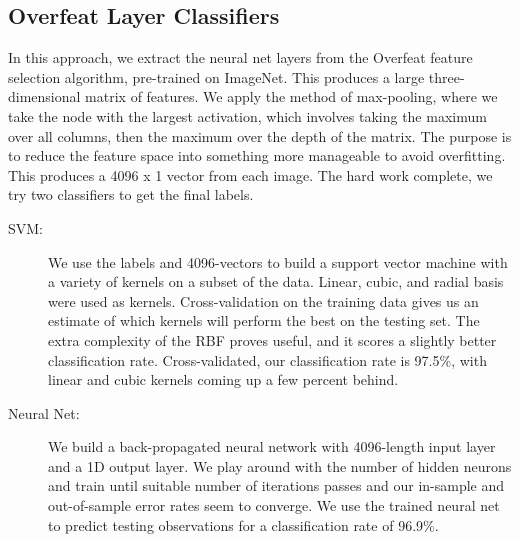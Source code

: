 \documentclass[12pt]{article}
\begin{document}
\subsection{Overfeat Layer Classifiers}
In this approach, we extract the neural net layers from the Overfeat feature selection algorithm, pre-trained on ImageNet. This produces a large three-dimensional matrix of features. We apply the method of max-pooling, where we take the node with the largest activation, which involves taking the maximum over all columns, then the maximum over the depth of the matrix. The purpose is to reduce the feature space into something more manageable to avoid overfitting. This produces a 4096 x 1 vector from each image. The hard work complete, we try two classifiers to get the final labels.
\begin{description}
\item[SVM:] We use the labels and 4096-vectors to build a support vector machine with a variety of kernels on a subset of the data. Linear, cubic, and radial basis were used as kernels. Cross-validation on the training data gives us an estimate of which kernels will perform the best on the testing set. The extra complexity of the RBF proves useful, and it scores a slightly better classification rate. Cross-validated, our classification rate is 97.5\%, with linear and cubic kernels coming up a few percent behind.

\item[Neural Net:] We build a back-propagated neural network with 4096-length input layer and a 1D output layer. We play around with the number of hidden neurons and train until suitable number of iterations passes and our in-sample and out-of-sample error rates seem to converge. We use the trained neural net to predict testing observations for a classification rate of 96.9\%.
\end{description}
\end{document}

